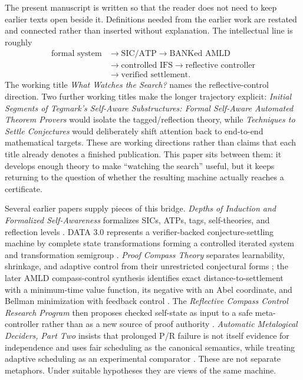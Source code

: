 \documentclass[11pt]{article}
\theoremstyle{definition}
\theoremstyle{remark}
\begin{document}
The present manuscript is written so that the reader does not need to keep earlier texts open beside it. Definitions needed from the earlier work are restated and connected rather than inserted without explanation. The intellectual line is roughly
\[
\begin{aligned}
\text{formal system}&\longrightarrow\text{SIC/ATP}\longrightarrow\text{BANKed AMLD}\\
&\longrightarrow\text{controlled IFS}\longrightarrow\text{reflective controller}\\
&\longrightarrow\text{verified settlement}.
\end{aligned}
\]
The working title \emph{What Watches the Search?} names the reflective-control direction. Two further working titles make the longer trajectory explicit: \emph{Initial Segments of Tegmark's Self-Aware Substructures: Formal Self-Aware Automated Theorem Provers} would isolate the tagged/reflection theory, while \emph{Techniques to Settle Conjectures} would deliberately shift attention back to end-to-end mathematical targets. These are working directions rather than claims that each title already denotes a finished publication. This paper sits between them: it develops enough theory to make ``watching the search'' useful, but it keeps returning to the question of whether the resulting machine actually reaches a certificate.

Several earlier papers supply pieces of this bridge. \emph{Depths of Induction and Formalized Self-Awareness} formalizes SICs, ATPs, tags, self-theories, and reflection levels \cite{Depths}. DATA 3.0 represents a verifier-backed conjecture-settling machine by complete state transformations forming a controlled iterated system and transformation semigroup \cite{Data3}. \emph{Proof Compass Theory} separates learnability, shrinkage, and adaptive control from their unrestricted conjectural forms \cite{ProofCompass}; the later AMLD compass-control synthesis identifies exact distance-to-settlement with a minimum-time value function, its negative with an Abel coordinate, and Bellman minimization with feedback control \cite{CompassControl}. The \emph{Reflective Compass Control Research Program} then proposes checked self-state as input to a safe meta-controller rather than as a new source of proof authority \cite{ReflectiveCompass}. \emph{Automatic Metalogical Deciders, Part Two} insists that prolonged P/R failure is not itself evidence for independence and uses fair scheduling as the canonical semantics, while treating adaptive scheduling as an experimental comparator \cite{AMLD2}. These are not separate metaphors. Under suitable hypotheses they are views of the same machine.
\end{document}
